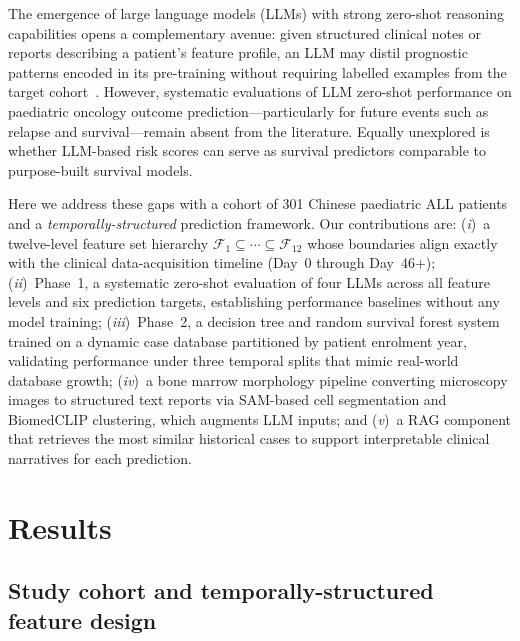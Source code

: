 \documentclass[pdflatex,sn-nature]{sn-jnl}
\begin{document}
The emergence of large language models (LLMs) with strong zero-shot
reasoning capabilities opens a complementary avenue: given structured
clinical notes or reports describing a patient's feature profile, an
LLM may distil prognostic patterns encoded in its pre-training without
requiring labelled examples from the target
cohort~\cite{[CITE:Phaterpekar2026]}.
However, systematic evaluations of LLM zero-shot performance on
paediatric oncology outcome prediction—particularly for future events
such as relapse and survival—remain absent from the literature.
Equally unexplored is whether LLM-based risk scores can serve as
survival predictors comparable to purpose-built survival models.

Here we address these gaps with a cohort of 301 Chinese paediatric ALL
patients and a \emph{temporally-structured} prediction framework.
Our contributions are: (\textit{i})~a twelve-level feature set
hierarchy $\mathcal{F}_1 \subseteq \cdots \subseteq \mathcal{F}_{12}$
whose boundaries align exactly with the clinical data-acquisition
timeline (Day~0 through Day~46+); (\textit{ii})~Phase~1, a systematic
zero-shot evaluation of four LLMs across all feature levels and six
prediction targets, establishing performance baselines without any
model training; (\textit{iii})~Phase~2, a decision tree and random
survival forest system trained on a dynamic case database partitioned
by patient enrolment year, validating performance under three temporal
splits that mimic real-world database growth; (\textit{iv})~a bone
marrow morphology pipeline converting microscopy images to structured
text reports via SAM-based cell segmentation and BiomedCLIP clustering,
which augments LLM inputs; and (\textit{v})~a RAG component that
retrieves the most similar historical cases to support interpretable
clinical narratives for each prediction.

\section{Results}\label{sec:results}

\subsection{Study cohort and temporally-structured feature design}
\label{sec:cohort}
\end{document}
